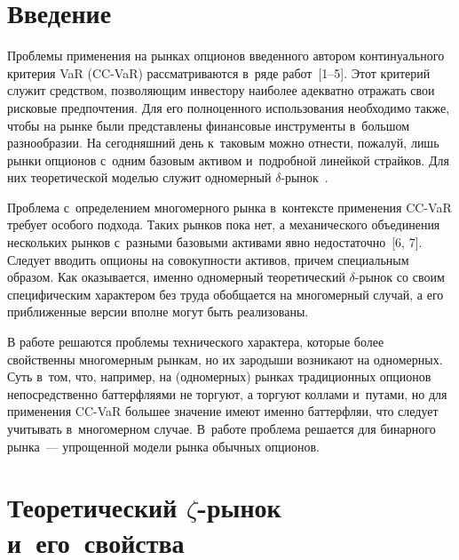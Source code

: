 


\thispagestyle{headings}

\begin{multicols}{2}

\label{st\stat}
  
  \section{Введение}
  
  Проблемы применения на рынках опционов введенного автором 
континуального критерия VaR (CC-VaR) рассматриваются в~ряде работ~[1--5]. 
Этот критерий служит средством, позволяющим ин\-вес\-то\-ру наиболее адекватно 
отражать свои рисковые предпочтения. Для его полноценного использования 
необходимо также, чтобы на рынке были представлены финансовые 
инструменты в~большом разнообразии. На сегодняшний день к~таковым можно 
отнести, пожалуй, лишь рынки опционов с~одним базовым активом 
и~подробной линейкой страйков. Для них теоретической моделью служит 
одномерный $\delta$-ры\-нок~\cite{2-ag, 3-ag, 4-ag}. 
  
  Проблема с~определением многомерного рынка в~контексте применения  
CC-VaR требует особого подхода. Таких рынков пока нет, а механического 
объединения нескольких рынков с~разными базовыми активами явно 
недостаточно~[6, 7]. Следует вводить опционы на совокупности активов, 
причем специальным образом. Как оказывается, именно одномерный 
теоретический $\delta$-ры\-нок со своим специфическим характером без труда 
обобщается на многомерный случай, а его приближенные версии вполне могут 
быть реализованы. 
  
  В работе решаются проблемы технического характера, которые более 
свойственны многомерным рынкам, но их зародыши возникают на 
одномерных. Суть в~том, что, например, на (одномерных) рынках 
традиционных опционов непосредственно баттерфляями не торгуют, а торгуют 
коллами и~путами, но для применения CC-VaR большее значение имеют 
именно баттерфляи, что следует учитывать в~многомерном случае. В~работе  
проб\-ле\-ма решается для бинарного рынка~--- упрощенной модели рынка 
обычных опционов. 
  
  \section{Теоретический $\zeta$-рынок и~его~свойства}
  

\end{multicols}
